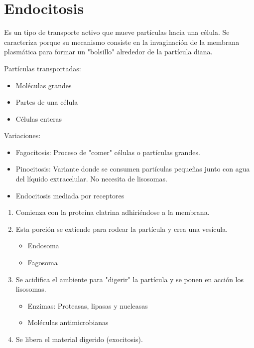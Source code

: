 \section{Endocitosis}

Es un tipo de transporte activo que mueve partículas hacia una célula. Se caracteriza porque su mecanismo consiste en la invaginación de la membrana plasmática para formar un "bolsillo" alrededor de la partícula diana.

Partículas transportadas:

\begin{itemize}
    \item Moléculas grandes
    \item Partes de una célula
    \item Células enteras
\end{itemize}

Variaciones:

\begin{itemize}
    \item Fagocitosis: Proceso de "comer" células o partículas grandes.
    \item Pinocitosis: Variante donde se consumen partículas pequeñas junto con agua del líquido extracelular. No necesita de lisosomas.
    \item Endocitosis mediada por receptores
\end{itemize}

\begin{enumerate}
    \item Comienza con la proteína clatrina adhiriéndose a la membrana.
    \item Esta porción se extiende para rodear la partícula y crea una vesícula.
        \begin{itemize}
            \item Endosoma
            \item Fagosoma
        \end{itemize}
    \item Se acidifica el ambiente para "digerir" la partícula y se ponen en acción los lisosomas.
        \begin{itemize}
            \item Enzimas: Proteasas, lipasas y nucleasas
            \item Moléculas antimicrobianas
        \end{itemize}
    \item Se libera el material digerido (exocitosis).
\end{enumerate}